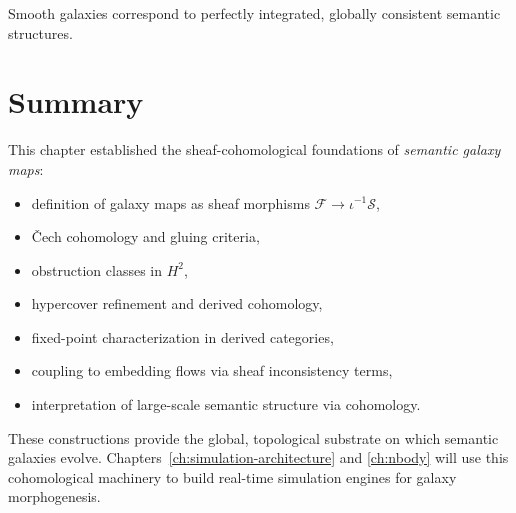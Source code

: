 Smooth galaxies correspond to perfectly integrated, 
globally consistent semantic structures.

\section{Summary}

This chapter established the sheaf-cohomological foundations of
\emph{semantic galaxy maps}:

\begin{itemize}
  \item definition of galaxy maps as sheaf morphisms 
        $\mathcal{F} \to \iota^{-1}\mathscr{S}$,
  \item Čech cohomology and gluing criteria,
  \item obstruction classes in $H^2$,
  \item hypercover refinement and derived cohomology,
  \item fixed-point characterization in derived categories,
  \item coupling to embedding flows via sheaf inconsistency terms,
  \item interpretation of large-scale semantic structure via cohomology.
\end{itemize}

These constructions provide the global, topological substrate on which
semantic galaxies evolve.  
Chapters~\ref{ch:simulation-architecture} and \ref{ch:nbody}
will use this cohomological machinery to build
real-time simulation engines for galaxy morphogenesis.
